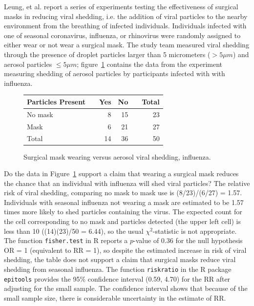 Leung, et al. report a series of experiments testing the effectiveness of surgical masks in reducing viral shedding, i.e. the addition of viral particles to the nearby environment from the breathing of infected individuals.  Individuals infected with one of seasonal coronavirus, influenza, or rhinovirus were randomly assigned to either wear or not wear a surgical mask.  The study team measured viral shedding through the presence of droplet particles larger than 5 micrometers ($> 5\mu m$) and aerosol particles $\leq 5\mu m$; figure~\ref{figure:influenzaAerosolViralShedding} contains the data from the experiment measuring shedding of aerosol particles by participants infected with with influenza.
\begin{figure}[h]
	\centering
	\begin{tabular}{ll rrr |r}
		\hline
		Particles Present	& \hspace{2mm} & Yes & No & \hspace{2mm} & Total \\
		\hline
        No mask & & 8 & 15 & & 23    \\
        Mask &	& 6 & 21 & & 27    \\
        \hline
        Total & & 14 & 36 & & 50 \\
		\hline
	\end{tabular}
	\caption{Surgical mask wearing versus aerosol viral shedding, influenza.}
    \label{figure:influenzaAerosolViralShedding}
\end{figure}

\begin{examplewrap}
  \begin{nexample}{Do the data in Figure~\ref{figure:influenzaAerosolViralShedding} support a claim that wearing a surgical mask reduces the chance that an individual with influenza will shed viral particles?}
    The relative risk of viral shedding, comparing no mask to mask use is (8/23)/(6/27) = 1.57.  Individuals with seasonal influenza not wearing a mask are estimated to be 1.57 times more likely to shed particles containing the virus. The expected count for the cell corresponding to no mask and particles detected (the upper left cell) is less than 10 ((14)(23)/50 = 6.44), so the usual $\chi^2$-statistic is not appropriate.  The function \texttt{fisher.test} in \textsf{R} reports a $p$-value of 0.36 for the null hypothesis OR = 1 (equivalent to RR = 1), so despite the estimated increase in risk of viral shedding, the table does not support a claim that surgical masks reduce viral shedding from seasonal influenza.  The function \texttt{riskratio} in the \textsf{R} package \texttt{epitools} provides the 95\% confidence interval (0.59, 4.70) for the RR after adjusting for the small sample.  The confidence interval shows that because of the small sample size, there is considerable uncertainty in the estimate of RR.

  \end{nexample}
\end{examplewrap}

